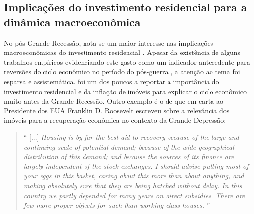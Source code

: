 \subsection{Implicações do investimento residencial para a dinâmica macroeconômica}

No pós-Grande Recessão, nota-se um maior interesse nas implicações macroeconômicas do investimento residencial   \cites{leamer_housing_2015}{teixeira_crescimento_2015}{fiebiger_trend_2017}.
Apesar da existência de alguns trabalhos empíricos evidenciando este gasto como um indicador antecedente para reversões do ciclo econômico no período do pós-guerra \cites{green_follow_1997}{leamer_housing_2007}, a atenção ao tema foi esparsa e assistemática.
\textcite{duesenberry_investment_1958} foi um dos poucos a reportar a importância do investimento residencial e da inflação de imóveis para explicar o ciclo econômico muito antes da Grande Recessão. 
Outro exemplo é o de \textcite{keynes_collected_1978} que em carta ao Presidente dos EUA Franklin D. Roosevelt escreveu sobre a relevância dos imóveis para a recuperação econômica no contexto da Grande Depressão: %

\begin{quote}
    `` [...] \textit{Housing is by far the best aid to recovery because of the large and continuing scale of potential demand; because of the wide geographical distribution of this demand; and because the sources of its finance are largely independent of the stock exchanges. I should advise putting most of your eggs in this basket, caring about this more than about anything, and making absolutely sure that they are being hatched without delay. In this country we partly depended for many years on direct subsidies. 
    There are few more proper objects for such than working-class houses.%
    }''
    \cite[p.~436]{keynes_collected_1978}
\end{quote}

